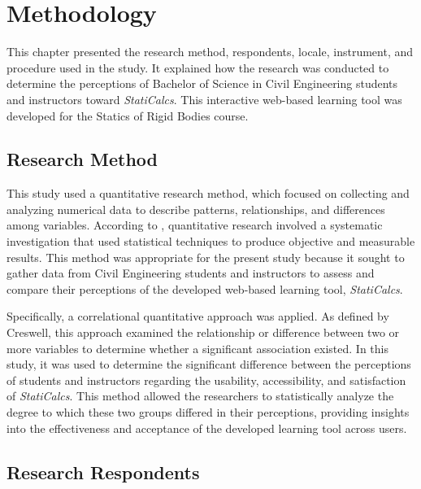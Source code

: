 \chapter{Methodology}\label{ch:3}

This chapter presented the research method, respondents, locale, instrument, and procedure used in the study. It explained how the research was conducted to determine the perceptions of Bachelor of Science in Civil Engineering students and instructors toward \textit{StatiCalcs}. This interactive web-based learning tool was developed for the Statics of Rigid Bodies course.


\section{Research Method}\label{sec:3-method}

    \hspace{1cm}This study used a quantitative research method, which focused on collecting and analyzing numerical data to describe patterns, relationships, and differences among variables. According to \cite{apuke_quantitative_2017}, quantitative research involved a systematic investigation that used statistical techniques to produce objective and measurable results. This method was appropriate for the present study because it sought to gather data from Civil Engineering students and instructors to assess and compare their perceptions of the developed web-based learning tool, \textit{StatiCalcs}.

    \hspace{1cm}Specifically, a correlational quantitative approach was applied. As defined by Creswell, this approach examined the relationship or difference between two or more variables to determine whether a significant association existed. In this study, it was used to determine the significant difference between the perceptions of students and instructors regarding the usability, accessibility, and satisfaction of \textit{StatiCalcs}. This method allowed the researchers to statistically analyze the degree to which these two groups differed in their perceptions, providing insights into the effectiveness and acceptance of the developed learning tool across users.


\section{Research Respondents}\label{sec:3-respo}


